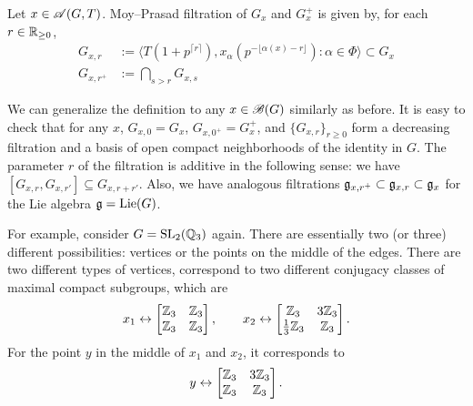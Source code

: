 \begin{definition}
Let $x \in \mathscr{A}(G, T)$.
Moy--Prasad filtration of $G_x$ and $G_x^+$ is given by, for each $r \in \mathbb{R}_{\ge 0}$,
\begin{align}
    G_{x, r} &:= \langle T(1 + p^{\lceil r \rceil}), x_{\alpha}(p^{-\lfloor \alpha(x) - r \rfloor}) : \alpha \in \Phi \rangle \subset G_x \\
    G_{x, r^+} &:= \bigcap_{s > r} G_{x, s}
\end{align}
\end{definition}
We can generalize the definition to any $x \in \mathscr{B}(G)$ similarly as before.
It is easy to check that for any $x$, $G_{x, 0} = G_{x}$, $G_{x, 0^+} = G_{x}^+$, and $\{G_{x, r}\}_{r \ge 0}$ form a decreasing filtration and a basis of open compact neighborhoods of the identity in $G$.
The parameter $r$ of the filtration is additive in the following sense: we have $[G_{x, r}, G_{x, r'}] \subseteq G_{x, r + r'}$.
Also, we have analogous filtrations $\mathfrak{g}_{x, r^+} \subset \mathfrak{g}_{x, r} \subset \mathfrak{g}_{x}$ for the Lie algebra $\mathfrak{g} = \mathrm{Lie}(G)$.

For example, consider $G = \mathrm{SL}_2(\mathbb{Q}_3)$ again.
There are essentially two (or three) different possibilities: vertices or the points on the middle of the edges.
There are two different types of vertices, correspond to two different conjugacy classes of maximal compact subgroups, which are
\[
    x_1 \leftrightarrow \begin{bmatrix} \mathbb{Z}_3 & \mathbb{Z}_3 \\ \mathbb{Z}_3 & \mathbb{Z}_3 \end{bmatrix}, \qquad x_2 \leftrightarrow \begin{bmatrix} \mathbb{Z}_3 & 3 \mathbb{Z}_3 \\ \frac{1}{3} \mathbb{Z}_3 & \mathbb{Z}_3 \end{bmatrix}.
\]
For the point $y$ in the middle of $x_1$ and $x_2$, it corresponds to
\[
    y \leftrightarrow \begin{bmatrix}
        \mathbb{Z}_3 & 3 \mathbb{Z}_3 \\ \mathbb{Z}_3 & \mathbb{Z}_3
    \end{bmatrix}.
\]

